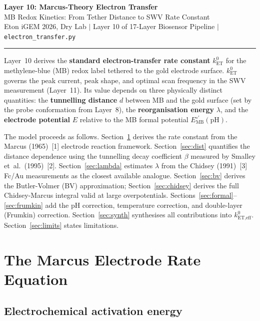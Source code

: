 \documentclass[10pt,a4paper]{article}
\numberwithin{equation}{section}
\newcommand{\kET}{k_{\text{ET}}^{0}}
\newcommand{\cit}[1]{[#1]}
\newcommand{\Eo}{E^{\circ\prime}}
\begin{document}
\begin{center}
{\LARGE\bfseries Layer 10: Marcus-Theory Electron Transfer}\\[0.4em]
{\large MB Redox Kinetics: From Tether Distance to SWV Rate Constant}\\[0.25em]
{\small\color{gray} Eton iGEM 2026, Dry Lab \quad$|$\quad
Layer 10 of 17-Layer Biosensor Pipeline \quad$|$\quad
\texttt{electron\_transfer.py}}
\end{center}
\vspace{0.4em}\hrule\vspace{0.7em}

\noindent
Layer~10 derives the \textbf{standard electron-transfer rate constant}
$\kET$ for the methylene-blue (MB) redox label tethered to the gold
electrode surface. $\kET$ governs the peak current, peak shape, and
optimal scan frequency in the SWV measurement (Layer~11). Its value
depends on three physically distinct quantities: the
\textbf{tunnelling distance} $d$ between MB and the gold surface
(set by the probe conformation from Layer~8), the
\textbf{reorganisation energy} $\lambda$, and the
\textbf{electrode potential} $E$ relative to the MB formal potential
$\Eo_{\text{MB}}(\text{pH})$.

The model proceeds as follows. Section~\ref{sec:marcus} derives the
rate constant from the Marcus (1965)~\cit{1} electrode reaction
framework. Section~\ref{sec:dist} quantifies the distance dependence
using the tunnelling decay coefficient $\beta$ measured by
Smalley et~al.\ (1995)~\cit{2}. Section~\ref{sec:lambda} estimates
$\lambda$ from the Chidsey (1991)~\cit{3} Fc/Au measurements as the
closest available analogue. Section~\ref{sec:bv} derives the
Butler-Volmer (BV) approximation; Section~\ref{sec:chidsey} derives
the full Chidsey-Marcus integral valid at large overpotentials.
Sections~\ref{sec:formal}--\ref{sec:frumkin} add the pH correction,
temperature correction, and double-layer (Frumkin) correction.
Section~\ref{sec:synth} synthesises all contributions into
$k^{0}_{\text{ET,eff}}$. Section~\ref{sec:limits} states limitations.

\section{The Marcus Electrode Rate Equation}
\label{sec:marcus}

\subsection{Electrochemical activation energy}
\end{document}
